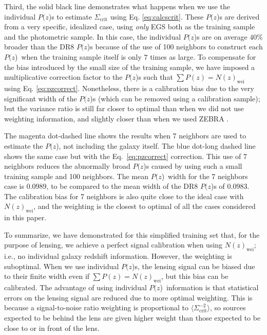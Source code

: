 \documentclass[12pt,preprint]{aastex}
\newcommand{\pofz}{$P(z$)}
\begin{document}
Third, the solid black line demonstrates what happens when we use the individual
\pofz s to estimate $\Sigma_\mathrm{crit}$ using Eq. \ref{eq:calcscrit}.  These
\pofz s are derived from a very specific, idealized case, using {\em only} EGS
both as the training sample and the photometric sample.  In this case, the
individual \pofz s are on average $40\%$ broader than the DR8 \pofz s because of
the use of 100 neighbors to construct each \pofz\ when the training sample
itself is only $7$ times as large.  To compensate for the bias introduced by
the small size of the training sample, we have imposed a multiplicative
correction factor to the \pofz s such that $\sum P(z) = N(z)_\mathrm{wei}$ using
Eq. \ref{eq:pzcorrect}.  Nonetheless, there is a calibration bias due to the
very significant width of the \pofz s (which can be removed using a calibration
sample); but the variance ratio is still far closer to optimal than when we did
not use weighting information, and slightly closer than when we used ZEBRA
\photoz.  

The magenta dot-dashed line shows the results when 7 neighbors are used to
estimate the \pofz, not including the galaxy itself. The blue dot-long dashed
line shows the same case but with the Eq.~\ref{eq:pzcorrect} correction.  This
use of 7 neighbors reduces the abnormally broad \pofz s caused by using such a
small training sample and 100 neighbors.  The mean \pofz\ width for the 7
neighbors case is 0.0989, to be compared to the mean width of the DR8 \pofz s of
0.0983. The calibration bias for 7 neighbors is also quite close to the ideal
case with $N(z)_\mathrm{wei}$, and the weighting is the closest to optimal of
all the cases considered in this paper.

To summarize, we have demonstrated for this simplified training set that, for
the purpose of lensing, we achieve a perfect signal calibration when using
$N(z)_\mathrm{wei}$; i.e., no individual galaxy redshift information.  However,
the weighting is suboptimal.  When we use individual \pofz s, the lensing signal
can be biased due to their finite width even if $\sum P(z) =
N(z)_\mathrm{wei}$, but this bias can be calibrated.  The advantage of
using individual \pofz\ information is that statistical errors on the lensing
signal are reduced due to more optimal weighting.  This is because a
signal-to-noise ratio weighting is proportional to $\langle \Sigma_{\mathrm{crit}}^{-2}
\rangle$, so sources expected to be behind the lens are given higher weight
than those expected to be close to or in front of the lens.
\end{document}
